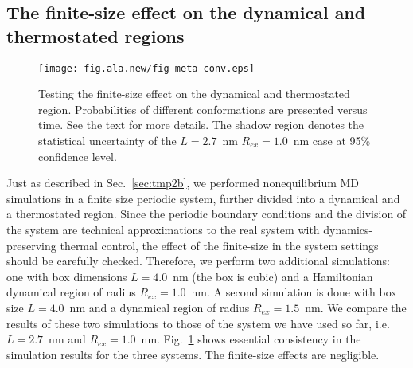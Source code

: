 \documentclass[a4paper,preprint,unsortedaddress,onecolumn]{revtex4-1}
\newcommand{\recheck}[1]{{\color{red} #1}}
\begin{document}
\subsection{The finite-size effect on the dynamical and thermostated regions}

\begin{figure}
  \centering
  \texttt{[image: fig.ala.new/fig-meta-conv.eps]}
  \caption{Testing the finite-size effect on the dynamical and thermostated region.
    Probabilities of different conformations are presented versus time.
    See the text for more details.
    \recheck{The shadow region denotes the
      statistical uncertainty of the $L=2.7$~nm $R_{ex}=1.0$~nm case at 95\% confidence level.
    }
  }
  \label{fig:tmp7}
\end{figure}

Just as described in Sec.~\ref{sec:tmp2b}, we performed nonequilibrium MD
simulations in a finite size periodic system, further divided 
into a dynamical and a thermostated region.
Since the periodic boundary conditions and the division of the system
are technical approximations to the real system with dynamics-preserving thermal control, 
the effect of the finite-size in 
the system settings should be carefully checked.
Therefore, we
perform two additional simulations: one with box dimensions
$L=4.0$~nm (the box is cubic) and a
Hamiltonian dynamical region of radius $R_{ex} = 1.0$~nm. A second simulation is done with box size $L=4.0$~nm and a dynamical region of
radius $R_{ex} = 1.5$~nm. We compare the results of these two simulations to those of the system we have used so far, i.e. $L=2.7$~nm and $R_{ex} = 1.0$~nm.
Fig.~\ref{fig:tmp7} shows essential consistency in
the simulation results for the three systems. The finite-size effects are
negligible.
\end{document}
